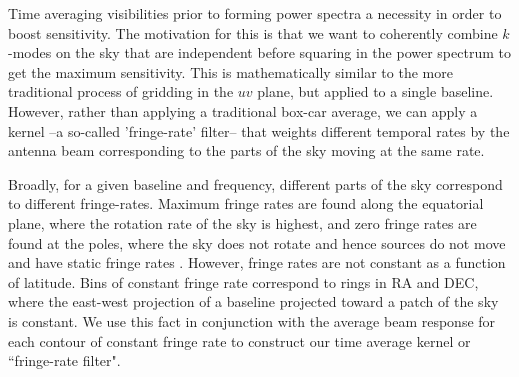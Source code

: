 \documentclass[twocolumn,numberedappendix]{emulateapj} \shorttitle{PSA64}
\begin{document}
Time averaging visibilities prior to forming power spectra a necessity in order to boost sensitivity.
The motivation for this is that we want
to coherently combine  $k$-modes on the sky that are independent  before squaring in the power spectrum to get the maximum
sensitivity. This is mathematically similar to the more traditional process of
gridding in the $uv$ plane, but applied to a single baseline.  
However, rather
than applying a traditional box-car average, we can apply a kernel --a so-called
'fringe-rate' filter-- that weights different temporal rates by the antenna
beam corresponding to the parts of the sky moving at the same rate.

Broadly, for a given baseline and frequency, different parts of the sky
correspond to different fringe-rates.  Maximum fringe rates are found along the
equatorial plane, where the rotation rate of the sky is highest, and zero
fringe rates are found at the poles, where the sky does not rotate and hence
sources do not move and have static fringe rates \citep{parsons_backer2009}.
However, fringe rates are not constant as a function of latitude. Bins of
constant fringe rate correspond to rings in RA and DEC, where
the east-west projection of a baseline projected toward a patch of the sky is
constant.  We use this fact in conjunction with the average beam response for each
contour of constant fringe rate to construct our time average kernel or
``fringe-rate filter".


%
\end{document}
